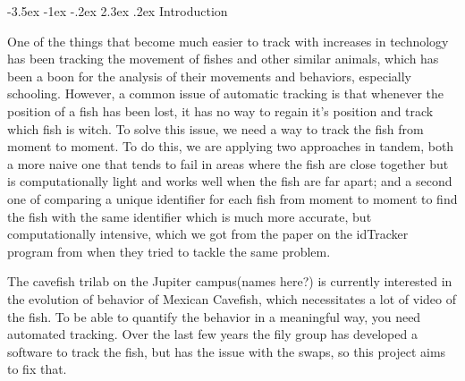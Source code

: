 \documentclass{article}
\makeatletter
\renewcommand\section{\clearpage\newpage\@startsection {section}{1}{\z@}%
	{-3.5ex \@plus -1ex \@minus -.2ex}%
	{2.3ex \@plus.2ex}%
	{\normalfont\Large\bfseries}}
\makeatother
\begin{document}
\singlespace
\newpage

\setlength{\parindent}{1em}



\section{Introduction}
\label{introduction}

One of the things that become much easier to track with increases in technology has been tracking the movement of fishes and other similar animals, which has been a boon for the analysis of their movements and behaviors, especially schooling. However, a common issue of automatic tracking is that whenever the position of a fish has been lost, it has no way to regain it's position and track which fish is witch. To solve this issue, we need a way to track the fish from moment to moment. To do this, we are applying two approaches in tandem, both a more naive one that tends to fail in areas where the fish are close together but is computationally light and works well when the fish are far apart; and a second one of comparing a unique identifier for each fish from moment to moment to find the fish with the same identifier which is much more accurate, but computationally intensive, which we got from the paper on the idTracker program from when they tried to tackle the same problem. 

The cavefish trilab on the Jupiter campus(names here?) is currently interested in the evolution of behavior of Mexican Cavefish, which necessitates a lot of video of the fish. To be able to quantify the behavior in a meaningful way, you need automated tracking. Over the last few years the fily group has developed a software to track the fish, but has the issue with the swaps, so this project aims to fix that.
\end{document}
